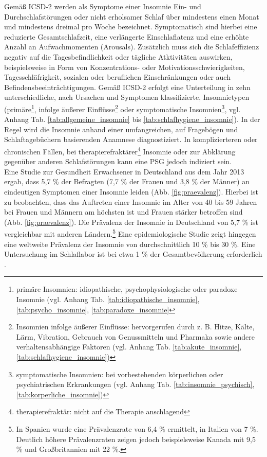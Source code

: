 Gemäß \acs{ICSD-2} werden als Symptome einer Insomnie Ein- und Durchschlafstörungen oder nicht erholsamer Schlaf über mindestens einen Monat und mindestens dreimal pro Woche bezeichnet. Symptomatisch sind hierbei eine reduzierte Gesamtschlafzeit, eine verlängerte Einschlaflatenz und eine erhöhte Anzahl an Aufwachmomenten (Arousals). Zusätzlich muss sich die Schlafeffizienz negativ auf die Tagesbefindlichkeit oder tägliche Atktivitäten auswirken, beispielsweise in Form von Konzentrations- oder Motivationsschwierigkeiten, Tagesschläfrigkeit, sozialen oder beruflichen Einschränkungen oder auch Befindensbeeinträchtigungen. Gemäß \acs{ICSD-2} erfolgt eine Unterteilung in zehn unterschiedliche, nach Ursachen und Symptomen klassifizierte, Insomnietypen (primäre\footnote{primäre Insomnien: idiopathische, psychophysiologische oder paradoxe Insomnie (vgl. Anhang Tab. \ref{tab:idiopathische_insomnie}, \ref{tab:psycho_insomnie}, \ref{tab:paradoxe_insomnie}}, infolge äußerer Einflüsse\footnote{Insomnien infolge äußerer Einflüsse: hervorgerufen durch z. B. Hitze, Kälte, Lärm, Vibration, Gebrauch von Genussmitteln und Pharmaka sowie andere verhaltensabhängige Faktoren (vgl. Anhang Tab. \ref{tab:akute_insomnie}, \ref{tab:schlafhygiene_insomnie})} oder symptomatische Insomnien\footnote{symptomatische Insomnien: bei vorbestehenden körperlichen oder psychiatrischen Erkrankungen (vgl. Anhang Tab. \ref{tab:insomnie_psychisch}, \ref{tab:korperliche_insomnie})}, vgl. Anhang Tab. \ref{tab:allgemeine_insomnie} bis \ref{tab:schlafhygiene_insomnie}). In der Regel wird die Insomnie anhand einer umfangreichen, auf Fragebögen und Schlaftagebüchern basierenden Anamnese diagnostiziert. In komplizierteren oder chronischen Fällen, bei therapierefraktärer\footnote{therapierefraktär: nicht auf die Therapie anschlagend} Insomnie oder zur Abklärung gegenüber anderen Schlafstörungen kann eine \acs{PSG} jedoch indiziert sein. \parencite{happe_schlafmedizin_2009, american_academy_of_sleep_medicine_international_2005, mayer_s3-leitlinie_2009}\\

Eine Studie zur Gesundheit Erwachsener in Deutschland aus dem Jahr 2013 ergab, dass 5,7 \% der Befragten (7,7 \% der Frauen und 3,8 \% der Männer) an eindeutigen Symptomen einer Insomnie leiden (Abb. \ref{fig:praevalenz}). Hierbei ist zu beobachten, dass das Auftreten einer Insomnie im Alter von 40 bis 59 Jahren bei Frauen und Männern am höchsten ist und Frauen stärker betroffen sind (Abb. \ref{fig:praevalenz}). Die Prävalenz der Insomnie in Deutschland von 5,7 \% ist vergleichbar mit anderen Ländern.\footnote{In Spanien wurde eine Prävalenzrate von 6,4 \% ermittelt, in Italien von 7 \%. Deutlich höhere Prävalenzraten zeigen jedoch beispielsweise Kanada mit 9,5 \% und Großbritannien mit 22 \%.} Eine epidemiologische Studie zeigt hingegen eine weltweite Prävalenz der Insomnie von durchschnittlich 10 \% bis 30 \%\parencite{ohayon_epidemiological_2011}. Eine Untersuchung im Schlaflabor ist bei etwa 1 \% der Gesamtbevölkerung erforderlich \parencite{penzel_schlafstorungen_2005}.
\parencite{schlack_haufigkeit_2013, robert_koch_institut_gesundheit_2015}

